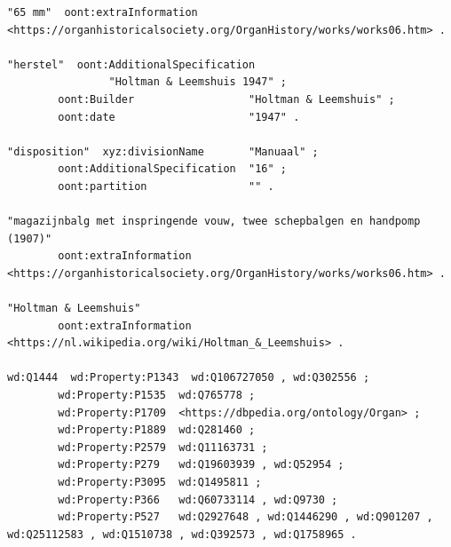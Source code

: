 \begin{lstlisting}[caption={Part14\_000Niezijl}]
"65 mm"  oont:extraInformation  <https://organhistoricalsociety.org/OrganHistory/works/works06.htm> .

"herstel"  oont:AdditionalSpecification
                "Holtman & Leemshuis 1947" ;
        oont:Builder                  "Holtman & Leemshuis" ;
        oont:date                     "1947" .

"disposition"  xyz:divisionName       "Manuaal" ;
        oont:AdditionalSpecification  "16" ;
        oont:partition                "" .

"magazijnbalg met inspringende vouw, twee schepbalgen en handpomp (1907)"
        oont:extraInformation  <https://organhistoricalsociety.org/OrganHistory/works/works06.htm> .

"Holtman & Leemshuis"
        oont:extraInformation  <https://nl.wikipedia.org/wiki/Holtman_&_Leemshuis> .

wd:Q1444  wd:Property:P1343  wd:Q106727050 , wd:Q302556 ;
        wd:Property:P1535  wd:Q765778 ;
        wd:Property:P1709  <https://dbpedia.org/ontology/Organ> ;
        wd:Property:P1889  wd:Q281460 ;
        wd:Property:P2579  wd:Q11163731 ;
        wd:Property:P279   wd:Q19603939 , wd:Q52954 ;
        wd:Property:P3095  wd:Q1495811 ;
        wd:Property:P366   wd:Q60733114 , wd:Q9730 ;
        wd:Property:P527   wd:Q2927648 , wd:Q1446290 , wd:Q901207 , wd:Q25112583 , wd:Q1510738 , wd:Q392573 , wd:Q1758965 .
\end{lstlisting}

